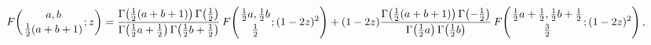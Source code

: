 \[\mathop{F\/}\nolimits\!\left({a,b\atop\tfrac{1}{2}(a+b+1)};z\right)=\frac{%
\mathop{\Gamma\/}\nolimits\!\left(\tfrac{1}{2}(a+b+1)\right)\mathop{\Gamma\/}%
\nolimits\!\left(\tfrac{1}{2}\right)}{\mathop{\Gamma\/}\nolimits\!\left(\tfrac%
{1}{2}a+\tfrac{1}{2}\right)\mathop{\Gamma\/}\nolimits\!\left(\tfrac{1}{2}b+%
\tfrac{1}{2}\right)}\mathop{F\/}\nolimits\!\left({\tfrac{1}{2}a,\tfrac{1}{2}b%
\atop\tfrac{1}{2}};(1-2z)^{2}\right)+(1-2z)\frac{\mathop{\Gamma\/}\nolimits\!%
\left(\tfrac{1}{2}(a+b+1)\right)\mathop{\Gamma\/}\nolimits\!\left(-\tfrac{1}{2%
}\right)}{\mathop{\Gamma\/}\nolimits\!\left(\tfrac{1}{2}a\right)\mathop{\Gamma%
\/}\nolimits\!\left(\tfrac{1}{2}b\right)}\mathop{F\/}\nolimits\!\left({\tfrac{%
1}{2}a+\tfrac{1}{2},\tfrac{1}{2}b+\tfrac{1}{2}\atop\tfrac{3}{2}};(1-2z)^{2}%
\right),\]